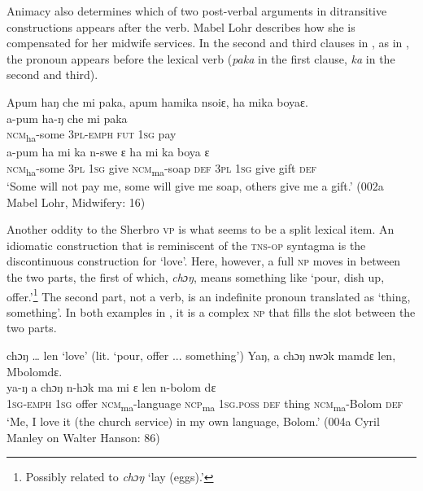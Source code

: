 Animacy also determines which of two post-verbal arguments in ditransitive constructions appears after the verb. Mabel Lohr describes how she is compensated for her midwife services. In the second and third clauses in , as in , the pronoun appears before the lexical verb (\textit{paka} in the first clause, \textit{ka} in the second and third).

\ea%
    \label{ex:200}
    Apum haŋ che mi paka, apum hamika nsoiɛ, ha mika boyaɛ.\\
    \gll a-pum      ha-ŋ      che  mi    paka\\
    \textsc{ncm}\textsubscript{ha}{}-some  \textsc{3pl-emph}  \textsc{fut}  \textsc{1sg}  pay\\
    \gll a-pum      ha    mi    ka    n-swe        ɛ    ha    mi    ka    boya  ɛ\\
    \textsc{ncm}\textsubscript{ha}{}-some  \textsc{3pl}  1\textsc{sg}  give  \textsc{ncm}\textsubscript{ma}{}-soap    \textsc{def}  \textsc{3pl}  \textsc{1sg}  give  gift  \textsc{def}\\
    \glt ‘Some will not pay me, some will give me soap, others give me a gift.' (002a Mabel Lohr, Midwifery: 16)
\z

Another oddity to the Sherbro \textsc{vp} is what seems to be a split lexical item. An idiomatic construction that is reminiscent of the \textsc{tns-op} syntagma is the discontinuous construction for ‘love'. Here, however, a full \textsc{np} moves in between the two parts, the first of which, \textit{chɔŋ}, means something like ‘pour, dish up, offer.'\footnote{Possibly related to \textit{chɔŋ} ‘lay (eggs).'} The second part, not a verb, is an indefinite pronoun translated as ‘thing, something'. In both examples in , it is a complex \textsc{np} that fills the slot between the two parts.

\ea%
    \label{ex:201}
    chɔŋ … len ‘love' (lit. ‘pour, offer ... something')
    \ea Yaŋ, a chɔŋ nwɔk mamdɛ len, Mbolomdɛ.\\
    \gll ya-ŋ      a    chɔŋ  n-hɔk          ma mi    ɛ    len    n-bolom    dɛ\\
    \textsc{1sg-emph}  \textsc{1sg}  offer  \textsc{ncm}\textsubscript{ma}{}-language  \textsc{ncp}\textsubscript{ma} \textsc{1sg.poss}  \textsc{def}  thing    \textsc{ncm}\textsubscript{ma}{}-Bolom  \textsc{def}\\
    \glt ‘Me, I love it (the church service) in my own language, Bolom.' (004a Cyril Manley on Walter Hanson: 86)

